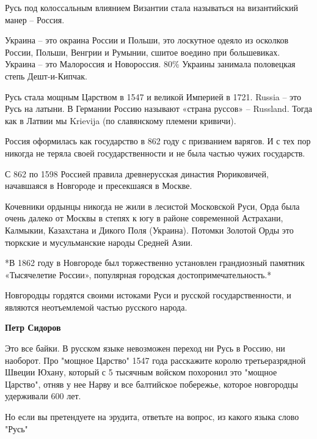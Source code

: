 \begin{itemize}
\begin{itemize}
Русь под колоссальным влиянием Византии стала называться на византийский манер
– Россия.

Украина – это окраина России и Польши, это лоскутное одеяло из осколков России,
Польши, Венгрии и Румынии, сшитое воедино при большевиках. Украина – это
Малороссия и Новороссия. 80\% Украины занимала половецкая степь Дешт-и-Кипчак.

Русь стала мощным Царством в 1547 и великой Империей в 1721. Russia – это Русь
на латыни. В Германии Россию называют «страна руссов» – Russland. Тогда как в
Латвии мы Krievija (по славянскому племени кривичи).

Россия оформилась как государство в 862 году с призванием варягов. И с тех пор
никогда не теряла своей государственности и не была частью чужих государств.

С 862 по 1598 Россией правила древнерусская династия Рюриковичей, начавшаяся в
Новгороде и пресекшаяся в Москве.

Кочевники ордынцы никогда не жили в лесистой Московской Руси, Орда была очень
далеко от Москвы в степях к югу в районе современной Астрахани, Калмыкии,
Казахстана и Дикого Поля (Украина). Потомки Золотой Орды это тюркские и
мусульманские народы Средней Азии.

*В 1862 году в Новгороде был торжественно установлен грандиозный памятник
«Тысячелетие России», популярная городская достопримечательность.*

Новгородцы гордятся своими истоками Руси и русской государственности, и
являются неотъемлемой частью русского народа.

 
\textbf{Петр Сидоров} 

Это все байки. В русском языке невозможен переход ни Русь в Россию, ни
наоборот. Про "мощное Царство" 1547 года расскажите королю третьеразрядной
Швеции Юхану, который с 5 тысячным войском похоронил это "мощное Царство",
отняв у нее Нарву и все балтийское побережье, которое новгородцы удерживали 600
лет.

Но если вы претендуете на эрудита, ответьте на вопрос, из какого языка слово
"Русь"


 

\end{itemize}
\end{itemize}
